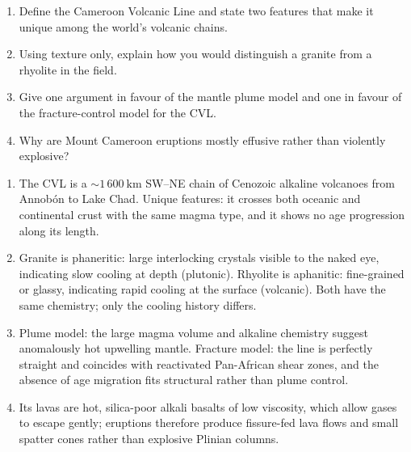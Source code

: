 \documentclass[11pt]{article}
\begin{document}
\begin{exercice}
\begin{enumerate}
\item Define the Cameroon Volcanic Line and state two features that make it unique among the world's volcanic chains.
\item Using texture only, explain how you would distinguish a granite from a rhyolite in the field.
\item Give one argument in favour of the mantle plume model and one in favour of the fracture-control model for the CVL.
\item Why are Mount Cameroon eruptions mostly effusive rather than violently explosive?
\end{enumerate}
\end{exercice}

\begin{corrige}[Exercise 1]
\begin{enumerate}
\item The CVL is a $\sim 1\,600\ \mathrm{km}$ SW--NE chain of Cenozoic alkaline volcanoes from Annobón to Lake Chad. Unique features: it crosses both oceanic and continental crust with the same magma type, and it shows no age progression along its length.
\item Granite is phaneritic: large interlocking crystals visible to the naked eye, indicating slow cooling at depth (plutonic). Rhyolite is aphanitic: fine-grained or glassy, indicating rapid cooling at the surface (volcanic). Both have the same chemistry; only the cooling history differs.
\item Plume model: the large magma volume and alkaline chemistry suggest anomalously hot upwelling mantle. Fracture model: the line is perfectly straight and coincides with reactivated Pan-African shear zones, and the absence of age migration fits structural rather than plume control.
\item Its lavas are hot, silica-poor alkali basalts of low viscosity, which allow gases to escape gently; eruptions therefore produce fissure-fed lava flows and small spatter cones rather than explosive Plinian columns.
\end{enumerate}
\end{corrige}
\end{document}

